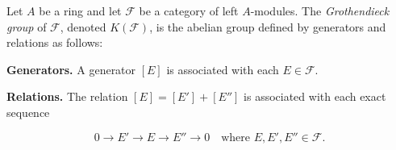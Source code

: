 Let $A$ be a ring and let $\mathcal{F}$ be a category of left $A$-modules. The \emph{Grothendieck group} of $\mathcal{F}$, denoted $K(\mathcal{F})$, is the abelian group defined by generators and relations as follows:

\noindent \textbf{Generators.} A generator $[E]$ is associated with each $E \in \mathcal{F}$.

\noindent \textbf{Relations.} The relation $[E] = [E'] + [E'']$ is associated with each exact sequence

$$0 \to E' \to E \to E'' \to 0 \quad \text{where } E, E', E'' \in \mathcal{F}.$$
